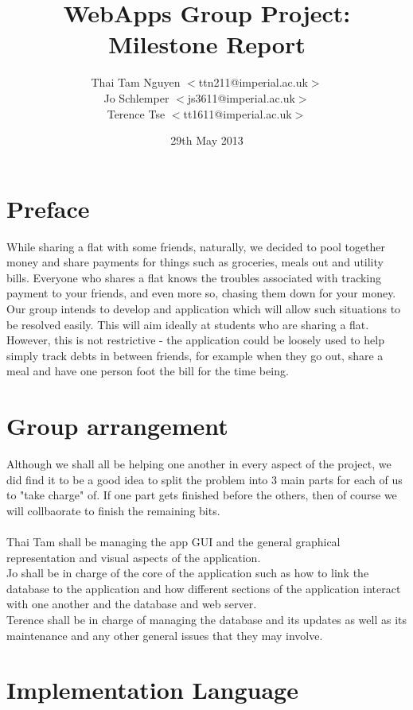 \documentclass[a4paper,9t]{article}
\begin{document}
\title{WebApps Group Project: Milestone Report} \date{29th May
  2013} \author{
  Thai Tam Nguyen $<$ttn211@imperial.ac.uk$>$\\
  Jo Schlemper $<$js3611@imperial.ac.uk$>$\\
  Terence Tse  $<$tt1611@imperial.ac.uk$>$ }
\maketitle
\section*{Preface}
While sharing a flat with some friends, naturally, we decided to pool together money and share payments for things such as groceries, meals out and utility bills. Everyone who shares a flat knows the troubles associated with tracking payment to your friends, and even more so, chasing them down for your money. Our group intends to develop and application which will allow such situations to be resolved easily. This will aim ideally at students who are sharing a flat. However, this is not restrictive - the application could be loosely used to help simply track debts in between friends, for example when they go out, share a meal and have one person foot the bill for the time being.\\

\section*{Group arrangement}
Although we shall all be helping one another in every aspect of the project, we did find it to be a good idea to split the problem into 3 main parts for each of us to "take charge" of. If one part gets finished before the others, then of course we will collbaorate to finish the remaining bits.\\ \\
Thai Tam shall be managing the app GUI and the general graphical representation and visual aspects of the application.\\
Jo shall be in charge of the core of the application such as how to link the database to the application and how different sections of the application interact with one another and the database and web server.\\
Terence shall be in charge of managing the database and its updates as well as its maintenance and any other general issues that they may involve.

\section*{Implementation Language}
\end{document}
